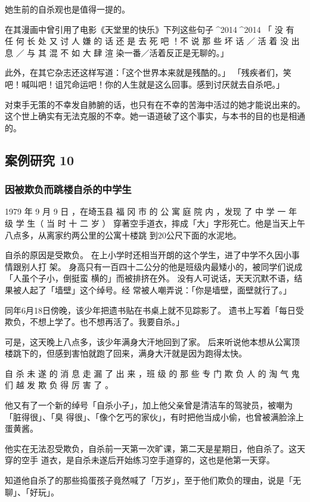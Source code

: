 \documentclass[UTF8]{ctexart}
\begin{document}
她生前的自杀观也是值得一提的。

在其漫画中曾引用了电影《天堂里的快乐》下列这些句子^^^^2014^^^^2014 「 没 有 任 何 长 处 又 讨 人 嫌 的 话 还 是 去 死 吧 ！不 说 那 些 坏 话 ／ 活 着 没 出 息 ／ 与 其 混 不 如 大 肆 渲 染一番／活着反正是无聊的。」

此外，在其它杂志还这样写道：「这个世界本来就是残酷的。」
「残疾者们，笑吧！喊叫吧！诅咒命运吧！你的人生就是这么回事。感到讨厌就去自杀吧。」

对束手无策的不幸发自肺腑的话，也只有在不幸的苦海中活过的她才能说出来的。
这个世上确实有无法克服的不幸。她一语道破了这个事实，与本书的目的也是相通的。


\subsection{案例研究 10}
\subsubsection*{因被欺负而跳楼自杀的中学生}

1979 年 9 月 9 日 ，在埼玉县 福 冈 市 的 公 寓 庭 院 内 ，发现 了 中 学 一 年 级 学 生（ 当 时 十 二 岁 ） 穿著空手道衣，摔成「大」字形死亡。他是当天上午八点多，从离家约两公里的公寓十楼跳 到$20$公尺下面的水泥地。

自杀的原因是受欺负。
在上小学时还相当开朗的这个学生，进了中学不久因小事情跟别人打 架。
身高只有一百四十二公分的他是班级内最矮小的，被同学们说成「人虽个子小，倒挺蛮 横的」而被排挤在外。
没有人可说话，天天沉默不语，结果被人起了「墙壁」这个绰号。经 常被人嘲弄说：「你是墙壁，面壁就行了。」

同年6月18日傍晚，该少年把遗书贴在书桌上就不见踪影了。
遗书上写着「每日受欺负，不想上学了。也不想再活了。我要自杀。」

可是，这天晚上八点多，该少年满身大汗地回到了家。
后来听说他本想从公寓顶楼跳下的，但感到害怕就跑了回来，满身大汗就是因为跑得太快。

自 杀 未 遂 的 消 息 走 漏 了 出 来 ，班 级 的 那 些 专 门 欺 负 人 的 淘 气 鬼 们 越 发 欺 负 得 厉 害 了 。

他又有了一个新的绰号「自杀小子」，加上他父亲曾是清洁车的驾驶员，被嘲为「脏得很」、「臭 得很」、「像个乞丐的家伙」，有时把他当成小偷，也曾被满脸涂上蛋黄酱。

他实在无法忍受欺负，自杀前一天第一次旷课，第二天是星期日，他自杀了。这天穿的空手 道衣，是自杀未遂后开始练习空手道穿的，这也是他第一天穿。

知道他自杀了的那些捣蛋孩子竟然喊了「万岁」，至于他们欺负的理由，说是「无聊」、「好玩」。
\end{document}
